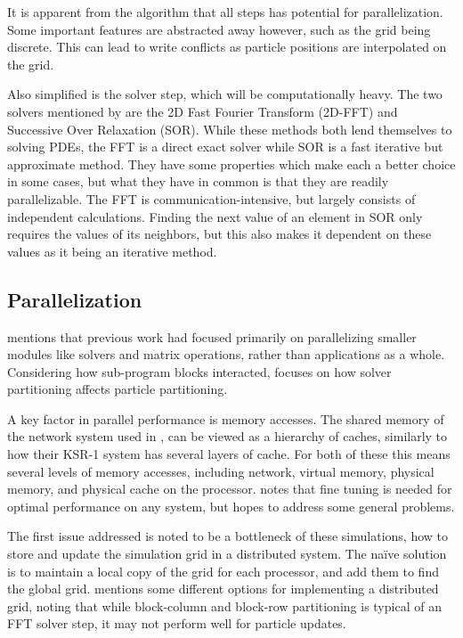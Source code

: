\documentclass[twocolumn]{article} %
\begin{document}
		It is apparent from the algorithm that all steps has potential for parallelization. Some important features are
		abstracted away however, such as the grid being discrete. This can lead to write conflicts as particle positions are
		interpolated on the grid.
		
		Also simplified is the solver step, which will be computationally heavy. The two solvers mentioned by \cite{elster94} are the 2D
		Fast Fourier Transform (2D-FFT) and Successive Over Relaxation (SOR). While these methods both lend themselves to
		solving PDEs, the FFT is a direct exact solver while SOR is a fast iterative but approximate method. They have some
		properties which make each a better choice in some cases, but what they have in common is that they are readily
		parallelizable. The FFT is communication-intensive, but largely consists of independent calculations. Finding the next
		value of an element in SOR only requires the values of its neighbors, but this also makes it dependent on these
		values as it being an iterative method.
	
	\subsection*{Parallelization}
		\cite{elster94} mentions that previous work had focused primarily on parallelizing smaller modules like solvers and matrix
		operations, rather than applications as	a whole. Considering how sub-program blocks interacted, \cite{elster94} focuses on how
		solver partitioning affects particle partitioning.
		
		A key factor in parallel performance is memory accesses. The shared memory of the network system used in \cite{elster94}, can be
		viewed as a hierarchy of caches, similarly to how their KSR-1 system has several layers of cache. For both of these
		this means several levels of memory accesses, including network, virtual memory, physical memory,	and physical cache on
		the processor. \cite{elster94} notes that fine tuning is needed for optimal performance on any system, but hopes to address some
		general problems.
		
		The first issue addressed is noted to be a bottleneck of these simulations, how to store and update the simulation grid
		in a distributed system. The naïve solution is to maintain a local copy of the grid for each processor, and add them
		to find the global grid. \cite{elster94} mentions some different options for implementing a distributed grid, noting
		that while block-column and block-row partitioning is typical of an FFT solver step, it may not perform well for
		particle updates.
		
\end{document}
